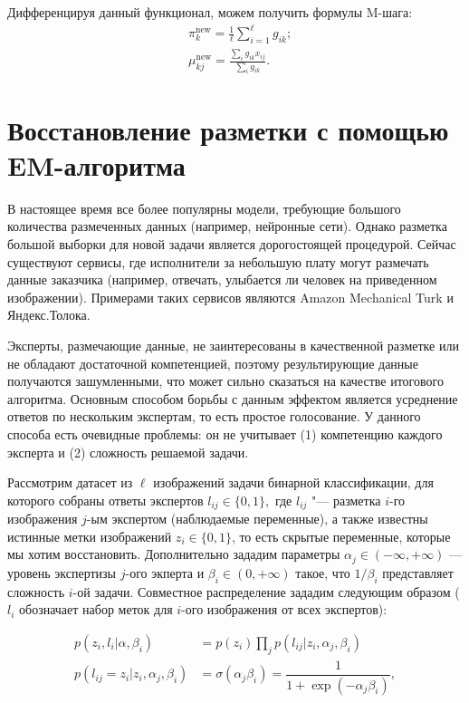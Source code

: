 \documentclass[12pt,a4paper]{article}
\begin{document}
Дифференцируя данный функционал, можем получить формулы M-шага:
\begin{align*}
	&\pi_k^{\text{new}} = \frac{1}{\ell} \sum_{i = 1}^{\ell}g_{ik};\\
	&\mu_{kj}^{\text{new}} = \frac{\sum_i g_{ik}x_{ij}}{\sum_i g_{ik}}.
\end{align*}

\section{Восстановление разметки с помощью EM-алгоритма}

\par В настоящее время все более популярны модели, требующие большого количества размеченных данных (например, нейронные сети).
Однако разметка большой выборки для новой задачи является дорогостоящей процедурой.
Сейчас существуют сервисы, где исполнители за небольшую плату могут размечать данные заказчика (например, отвечать, улыбается ли человек на приведенном изображении). Примерами таких сервисов являются Amazon Mechanical Turk и Яндекс.Толока.

\par Эксперты, размечающие данные, не заинтересованы в качественной разметке или не обладают достаточной компетенцией, поэтому результирующие данные получаются зашумленными, что может сильно сказаться на качестве итогового алгоритма.
Основным способом борьбы с данным эффектом является усреднение ответов по нескольким экспертам, то есть простое голосование.
У данного способа есть очевидные проблемы: он не учитывает (1) компетенцию каждого эксперта и (2) сложность решаемой задачи.

\par Рассмотрим датасет из $\ell$ изображений задачи бинарной классификации, для которого собраны ответы экспертов $l_{ij} \in \{0, 1\},$ где $l_{ij}$ "--- разметка $i$-го изображения $j$-ым экспертом (наблюдаемые переменные), а также известны истинные метки изображений $z_i \in \{0, 1\}$, то есть скрытые переменные, которые мы хотим восстановить. Дополнительно зададим параметры $\alpha_j \in (-\infty, +\infty)$ --- уровень экспертизы $j$-ого экперта и $\beta_i \in (0, +\infty)$ такое, что $1/\beta_i$ представляет сложность $i$-ой задачи. Совместное распределение зададим следующим образом ($l_{i}$ обозначает набор меток для $i$-ого изображения от всех экспертов):

\begin{align*}
p(z_{i}, l_{i} | \alpha, \beta_i) &= p(z_i) \prod_{j} p(l_{ij} | z_{i}, \alpha_j, \beta_i) \\
p(l_{ij} = z_{i}| z_{i}, \alpha_j, \beta_i) &= \sigma(\alpha_j \beta_i) = \dfrac{1}{1 + \exp(-\alpha_j\beta_i)},
\end{align*}
\end{document}
